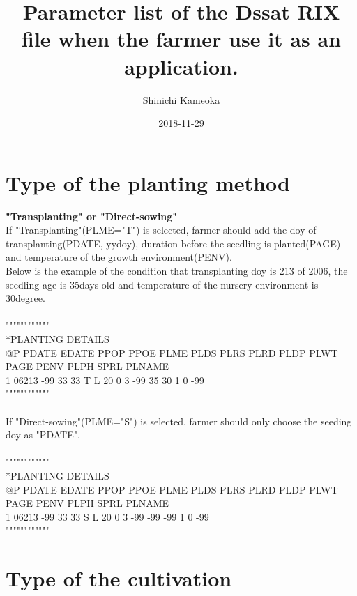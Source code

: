 \documentclass[11pt,a4j]{jarticle}
\title{Parameter list of the Dssat RIX file when the farmer use it as an application.}
\author{Shinichi Kameoka}
\date{2018-11-29}
\begin{document}
  \maketitle
 
  \section{Type of the planting method}
  
{\bf "Transplanting" or "Direct-sowing"}\\

If "Transplanting"(PLME="T") is selected, farmer should add the doy of transplanting(PDATE, yydoy), duration before the seedling is planted(PAGE) and temperature of the growth environment(PENV).\\\vspace{0.2in}
Below is the example of the condition that transplanting doy is 213 of 2006, the seedling age is 35days-old and temperature of the nursery environment is 30degree.\\
\\
""""""""""""\\
*PLANTING DETAILS\\
@P PDATE EDATE  PPOP  PPOE  PLME  PLDS  PLRS  PLRD  PLDP  PLWT  PAGE  PENV  PLPH  SPRL                        PLNAME\\
 1 06213   -99    33    33     T     L    20     0     3   -99    35    30     1     0                        -99\\
""""""""""""\\
\\\vspace{0.2in}
If "Direct-sowing"(PLME="S") is selected, farmer should only choose the seeding doy as "PDATE".\\
\\
""""""""""""\\
*PLANTING DETAILS\\
@P PDATE EDATE  PPOP  PPOE  PLME  PLDS  PLRS  PLRD  PLDP  PLWT  PAGE  PENV  PLPH  SPRL                        PLNAME\\
 1 06213   -99    33    33     S     L    20     0     3   -99   -99   -99     1     0                        -99\\
""""""""""""\\ 
 
  \section{Type of the cultivation}
  
\end{document}
